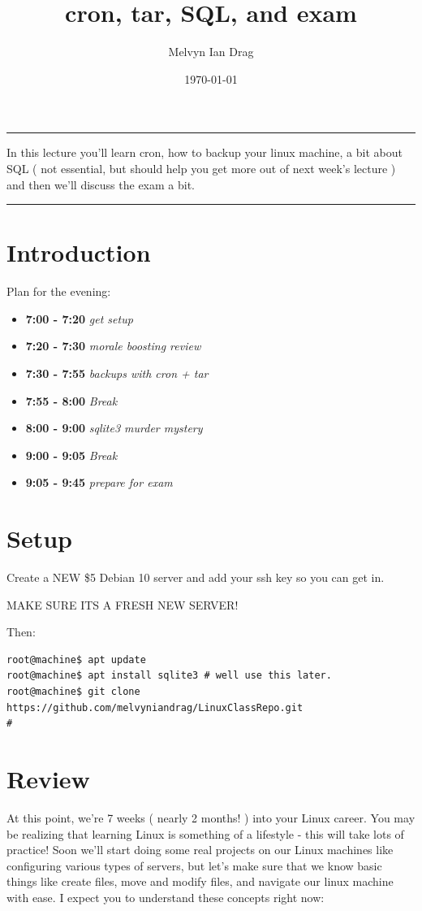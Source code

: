 \documentclass[12pt,a4paper]{article}
\newcommand{\schedule}[2]{\textbf{#1} \textit{#2}}
\renewenvironment{abstract}{%
\hfill\begin{minipage}{0.95\textwidth}
\rule{\textwidth}{1pt}}
{\par\noindent\rule{\textwidth}{1pt}\end{minipage}}
\begin{document}
%
\title{\textbf{cron, tar, SQL, and exam}}
\author[1]{Melvyn Ian Drag}
\date{\today}
%
\maketitle
%
\begin{abstract}
In this lecture you'll learn cron, how to backup your linux machine, a bit about
SQL ( not essential, but should help you get more out of next week's lecture )
and then we'll discuss the exam a bit.
\end{abstract}

\section{Introduction}
Plan for the evening:
\begin{itemize}
\setlength\itemsep{0em}
\item \schedule{7:00 - 7:20}{get setup}
\item \schedule{7:20 - 7:30}{morale boosting review}
\item \schedule{7:30 - 7:55}{backups with cron + tar}
\item \schedule{7:55 - 8:00}{Break}
\item \schedule{8:00 - 9:00}{sqlite3 murder mystery}
\item \schedule{9:00 - 9:05}{Break}
\item \schedule{9:05 - 9:45}{prepare for exam}
\end{itemize}

\section{Setup}

Create a NEW \$5 Debian 10 server and add your ssh key so you can get in.

{\LARGE MAKE SURE ITS A FRESH NEW SERVER! }

Then:
\begin{lstlisting}[style=term]
root@machine$ apt update
root@machine$ apt install sqlite3 # well use this later.
root@machine$ git clone https://github.com/melvyniandrag/LinuxClassRepo.git
#\end{lstlisting}

\section{Review}

At this point, we're 7 weeks ( nearly 2 months! ) into your Linux career. You
may be realizing that learning Linux is something of a lifestyle - this will
take lots of practice! Soon we'll start doing some real projects on our Linux
machines like configuring various types of servers, but let's make sure that we
know basic things like create files, move and modify files, and navigate our
linux machine with ease.
 I expect you to understand these concepts right
now:
\end{document}
